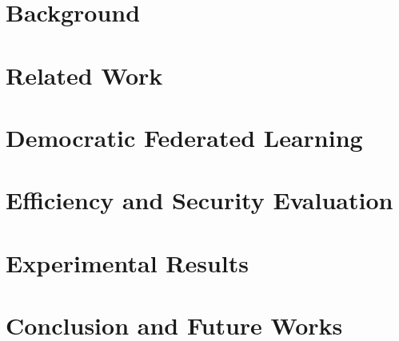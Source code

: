 \documentclass[journal]{IEEEtran}
\begin{document}
\section{Background}
\label{sec:back}


\section{Related Work}
\label{sec:related}


\section{Democratic Federated Learning}
\label{sec:DemoFL}


\section{Efficiency and Security Evaluation}
\label{sec:eval}


\section{Experimental Results}
\label{sec:exp}


\section{Conclusion and Future Works}
\label{sec:conc}





\end{document}
